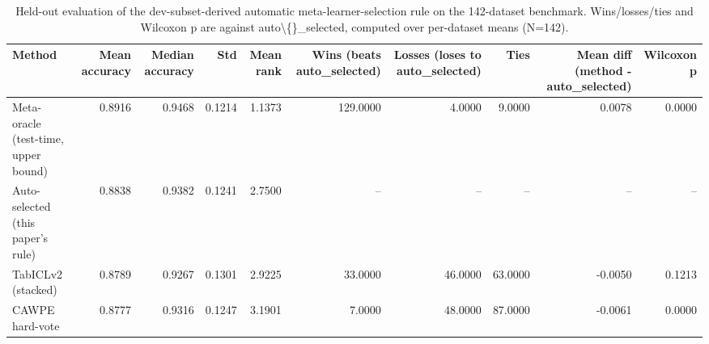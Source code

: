 \begin{table}[t]
\centering
\begin{tabular}{lrrrrrrrrr}
\toprule
Method & Mean accuracy & Median accuracy & Std & Mean rank & Wins (beats auto\_selected) & Losses (loses to auto\_selected) & Ties & Mean diff (method - auto\_selected) & Wilcoxon p \\
\midrule
Meta-oracle (test-time, upper bound) & 0.8916 & 0.9468 & 0.1214 & 1.1373 & 129.0000 & 4.0000 & 9.0000 & 0.0078 & 0.0000 \\
Auto-selected (this paper's rule) & 0.8838 & 0.9382 & 0.1241 & 2.7500 & -- & -- & -- & -- & -- \\
TabICLv2 (stacked) & 0.8789 & 0.9267 & 0.1301 & 2.9225 & 33.0000 & 46.0000 & 63.0000 & -0.0050 & 0.1213 \\
CAWPE hard-vote & 0.8777 & 0.9316 & 0.1247 & 3.1901 & 7.0000 & 48.0000 & 87.0000 & -0.0061 & 0.0000 \\
\bottomrule
\end{tabular}
\caption{Held-out evaluation of the dev-subset-derived automatic meta-learner-selection rule on the 142-dataset benchmark. Wins/losses/ties and Wilcoxon p are against auto\textbackslash\{\}\_selected, computed over per-dataset means (N=142).}
\label{tab:auto_selected_vs_fixed_methods}
\end{table}